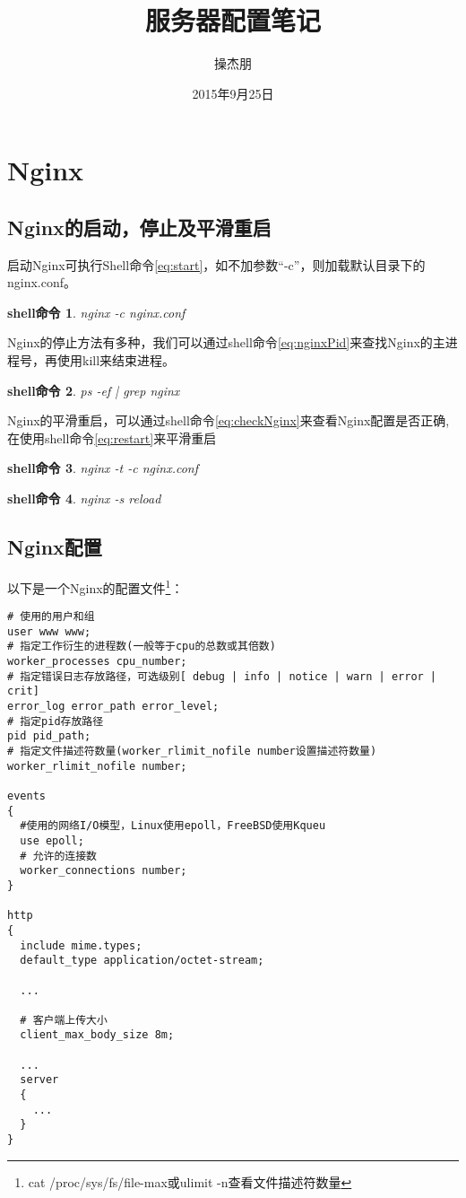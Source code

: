 \documentclass[UTF8]{ctexart}
\title{\heiti 服务器配置笔记}
\author{\kaishu 操杰朋}
\date{2015年9月25日}
\newtheorem{shellcommand}{shell命令}
\begin{document}
\maketitle
\clearpage

\tableofcontents
\clearpage

\section{Nginx}
\subsection{Nginx的启动，停止及平滑重启}
启动Nginx可执行Shell命令\eqref{eq:start}，如不加参数“-c”，则加载默认目录下的nginx.conf。

\begin{shellcommand}
  nginx -c nginx.conf \label{eq:start}
\end{shellcommand}

Nginx的停止方法有多种，我们可以通过shell命令\eqref{eq:nginxPid}来查找Nginx的主进程号，再使用kill来结束进程。

\begin{shellcommand}
  ps -ef | grep nginx \label{eq:nginxPid}
\end{shellcommand}

Nginx的平滑重启，可以通过shell命令\eqref{eq:checkNginx}来查看Nginx配置是否正确,在使用shell命令\eqref{eq:restart}来平滑重启
\begin{shellcommand}
  nginx -t -c nginx.conf \label{eq:checkNginx}
\end{shellcommand}
\begin{shellcommand}
  nginx -s reload \label{eq:restart}
\end{shellcommand}

\subsection{Nginx配置}
以下是一个Nginx的配置文件\footnote{cat /proc/sys/fs/file-max或ulimit -n查看文件描述符数量}：

\begin{verbatim}
# 使用的用户和组
user www www;
# 指定工作衍生的进程数(一般等于cpu的总数或其倍数)
worker_processes cpu_number;
# 指定错误日志存放路径，可选级别[ debug | info | notice | warn | error | crit]
error_log error_path error_level;
# 指定pid存放路径
pid pid_path;
# 指定文件描述符数量(worker_rlimit_nofile number设置描述符数量)
worker_rlimit_nofile number;

events
{
  #使用的网络I/O模型，Linux使用epoll，FreeBSD使用Kqueu
  use epoll;
  # 允许的连接数
  worker_connections number;
}

http
{
  include mime.types;
  default_type application/octet-stream;
  
  ...
  
  # 客户端上传大小
  client_max_body_size 8m;
  
  ...
  server
  {
    ...
  }
}
\end{verbatim}
\end{document}

